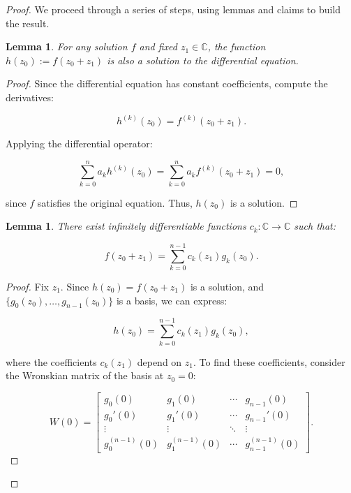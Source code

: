 \documentclass{article}
\newtheorem{lemma}[theorem]{Lemma}
\begin{document}
	\begin{proof}
		We proceed through a series of steps, using lemmas and claims to build the result.
		
		\begin{lemma}
			For any solution \(f\) and fixed \(z_1 \in \mathbb{C}\), the function \(h(z_0) := f(z_0 + z_1)\) is also a solution to the differential equation.
		\end{lemma}
		
		\begin{proof}
			Since the differential equation has constant coefficients, compute the derivatives:
			
			\begin{equation}
				h^{(k)}(z_0) = f^{(k)}(z_0 + z_1).
			\end{equation}
			
			Applying the differential operator:
			
			\begin{equation}
				\sum_{k=0}^n a_k h^{(k)}(z_0) = \sum_{k=0}^n a_k f^{(k)}(z_0 + z_1) = 0,
			\end{equation}
			
			since \(f\) satisfies the original equation. Thus, \(h(z_0)\) is a solution.
		\end{proof}
		
		\begin{lemma}
			There exist infinitely differentiable functions \(c_k: \mathbb{C} \to \mathbb{C}\) such that:
			
			\begin{equation}
				f(z_0 + z_1) = \sum_{k=0}^{n-1} c_k(z_1) g_k(z_0).
			\end{equation}
		\end{lemma}
		
		\begin{proof}
			Fix \(z_1\). Since \(h(z_0) = f(z_0 + z_1)\) is a solution, and \(\{g_0(z_0), \ldots, g_{n-1}(z_0)\}\) is a basis, we can express:
			
			\begin{equation}
				h(z_0) = \sum_{k=0}^{n-1} c_k(z_1) g_k(z_0),
			\end{equation}
			
			where the coefficients \(c_k(z_1)\) depend on \(z_1\). To find these coefficients, consider the Wronskian matrix of the basis at \(z_0 = 0\):
			
			\begin{equation}
				W(0) = \begin{bmatrix}
					g_0(0) & g_1(0) & \cdots & g_{n-1}(0) \\
					g_0'(0) & g_1'(0) & \cdots & g_{n-1}'(0) \\
					\vdots & \vdots & \ddots & \vdots \\
					g_0^{(n-1)}(0) & g_1^{(n-1)}(0) & \cdots & g_{n-1}^{(n-1)}(0)
				\end{bmatrix}.
			\end{equation}
			

\end{proof}
\end{proof}
\end{document}
